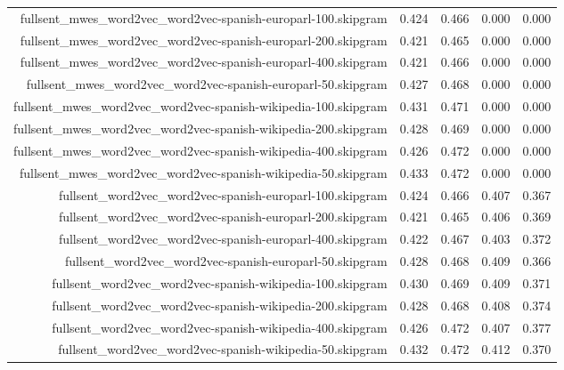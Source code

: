 \begin{figure*}
\begin{centering}
\begin{tabulary}{\textwidth}{|R|L|L|L|L|}
fullsent_mwes_word2vec_word2vec-spanish-europarl-100.skipgram & 0.424 & 0.466 & 0.000 & 0.000 \\
fullsent_mwes_word2vec_word2vec-spanish-europarl-200.skipgram & 0.421 & 0.465 & 0.000 & 0.000 \\
fullsent_mwes_word2vec_word2vec-spanish-europarl-400.skipgram & 0.421 & 0.466 & 0.000 & 0.000 \\
fullsent_mwes_word2vec_word2vec-spanish-europarl-50.skipgram & 0.427 & 0.468 & 0.000 & 0.000 \\
fullsent_mwes_word2vec_word2vec-spanish-wikipedia-100.skipgram & 0.431 & 0.471 & 0.000 & 0.000 \\
fullsent_mwes_word2vec_word2vec-spanish-wikipedia-200.skipgram & 0.428 & 0.469 & 0.000 & 0.000 \\
fullsent_mwes_word2vec_word2vec-spanish-wikipedia-400.skipgram & 0.426 & 0.472 & 0.000 & 0.000 \\
fullsent_mwes_word2vec_word2vec-spanish-wikipedia-50.skipgram & 0.433 & 0.472 & 0.000 & 0.000 \\
fullsent_word2vec_word2vec-spanish-europarl-100.skipgram & 0.424 & 0.466 & 0.407 & 0.367 \\
fullsent_word2vec_word2vec-spanish-europarl-200.skipgram & 0.421 & 0.465 & 0.406 & 0.369 \\
fullsent_word2vec_word2vec-spanish-europarl-400.skipgram & 0.422 & 0.467 & 0.403 & 0.372 \\
fullsent_word2vec_word2vec-spanish-europarl-50.skipgram & 0.428 & 0.468 & 0.409 & 0.366 \\
fullsent_word2vec_word2vec-spanish-wikipedia-100.skipgram & 0.430 & 0.469 & 0.409 & 0.371 \\
fullsent_word2vec_word2vec-spanish-wikipedia-200.skipgram & 0.428 & 0.468 & 0.408 & 0.374 \\
fullsent_word2vec_word2vec-spanish-wikipedia-400.skipgram & 0.426 & 0.472 & 0.407 & 0.377 \\
fullsent_word2vec_word2vec-spanish-wikipedia-50.skipgram & 0.432 & 0.472 & 0.412 & 0.370 \\
    \hline
    \hline


\end{tabulary}
\end{centering}
\end{figure*}
